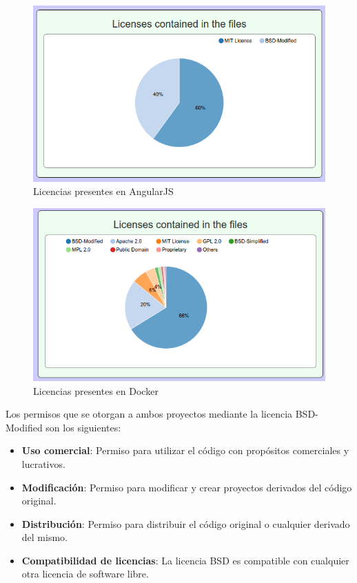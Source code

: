 \documentclass[a4paper, spanish, 12pt]{book}
\begin{document}
\begin{figure}
  \centering
  \includegraphics[width=14cm, keepaspectratio]{img/licenses_angular}
  \caption{Licencias presentes en AngularJS}
  \label{fig:angular_license}
\end{figure}

\begin{figure}
  \centering
  \includegraphics[width=14cm, keepaspectratio]{img/licenses_docker}
  \caption{Licencias presentes en Docker}
  \label{fig:docker_license}
\end{figure}

Los permisos que se otorgan a ambos proyectos mediante la licencia BSD-Modified son los siguientes:

\begin{itemize}
	\item \textbf{Uso comercial}: Permiso para utilizar el c\'odigo con prop\'ositos comerciales y lucrativos.

	\item \textbf{Modificaci\'on}: Permiso para modificar y crear proyectos derivados del c\'odigo original.

	\item \textbf{Distribuci\'on}: Permiso para distribuir el c\'odigo original o cualquier derivado del mismo.

	\item \textbf{Compatibilidad de licencias}: La licencia BSD es compatible con cualquier otra licencia de software libre.
\end{itemize}
\end{document}
